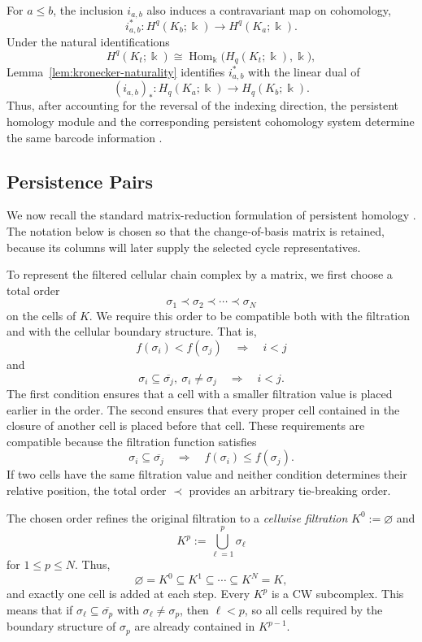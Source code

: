 \documentclass[11pt]{article}
\theoremstyle{paperdefinition}
\theoremstyle{paperplain}
\theoremstyle{paperremark}
\begin{document}
For $a\leq b$, the inclusion $i_{a,b}$ also induces a contravariant map on cohomology,
\[
i_{a,b}^*: H^q(K_b;\Bbbk) \longrightarrow H^q(K_a;\Bbbk).
\]
Under the natural identifications
\[
H^q(K_t;\Bbbk) \cong \operatorname{Hom}_{\Bbbk}\bigl(H_q(K_t;\Bbbk),\Bbbk\bigr),
\]
Lemma~\ref{lem:kronecker-naturality} identifies $i_{a,b}^*$ with the linear dual of
\[
(i_{a,b})_*: H_q(K_a;\Bbbk) \longrightarrow H_q(K_b;\Bbbk).
\]
Thus, after accounting for the reversal of the indexing direction, the persistent homology module and the corresponding persistent cohomology system determine the same barcode information \cite{desilva2011dualities}.

\subsection{Persistence Pairs}
\label{subsec:filtered-matrix-reduction}

We now recall the standard matrix-reduction formulation of persistent homology \cite{edelsbrunner2002topological,zomorodian2005computing, edelsbrunnerharer2010computational}. The notation below is chosen so that the change-of-basis matrix is retained, because its columns will later supply the selected cycle representatives.

To represent the filtered cellular chain complex by a matrix, we first choose a total order
\[
\sigma_1\prec\sigma_2\prec\cdots\prec\sigma_N
\]
on the cells of $K$. We require this order to be compatible both with the filtration and with the cellular boundary structure. That is,
\[
f(\sigma_i)<f(\sigma_j)\quad\Longrightarrow\quad i<j
\]
and
\[
\sigma_i\subseteq\overline{\sigma_j},\ \sigma_i\neq\sigma_j \quad\Longrightarrow\quad i<j.
\]
The first condition ensures that a cell with a smaller filtration value is placed earlier in the order. The second ensures that every proper cell contained in the closure of another cell is placed before that cell. These requirements are compatible because the filtration function satisfies
\[
\sigma_i\subseteq\overline{\sigma_j} \quad\Longrightarrow\quad f(\sigma_i)\leq f(\sigma_j).
\]
If two cells have the same filtration value and neither condition determines their relative position, the total order $\prec$ provides an arbitrary tie-breaking order.

The chosen order refines the original filtration to a \emph{cellwise filtration} $K^0:=\varnothing$ and
\[
K^p:=\bigcup_{\ell=1}^{p}\sigma_\ell
\]
for $1\leq p\leq N$. Thus,
\[
\varnothing = K^0 \subseteq K^1 \subseteq \cdots \subseteq K^N = K,
\]
and exactly one cell is added at each step. Every $K^p$ is a CW subcomplex. This means that if $\sigma_\ell \subseteq \overline{\sigma_p}$ with $\sigma_\ell\neq\sigma_p$, then $\ell<p$, so all cells required by the boundary structure of $\sigma_p$ are already contained in $K^{p-1}$.
\end{document}
